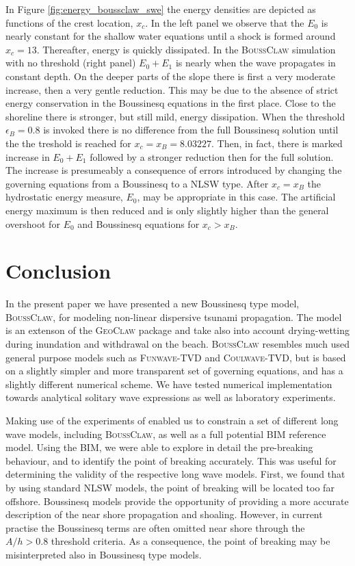 \documentclass[review]{elsarticle}
\newcommand{\BoussClaw}{\textsc{BoussClaw} }
\newcommand{\BoussClawt}{\textsc{BoussClaw}}
\begin{document}
In Figure \ref{fig:energy_boussclaw_swe} the energy densities are depicted as 
functions of the crest location, $x_c$. 
In the left panel 
we observe that the $E_0$ is nearly constant 
for the shallow water equations until a shock is formed around $x_c=13$.
Thereafter, energy is quickly dissipated. 
In  the \BoussClaw simulation with no threshold (right panel) 
$E_0+E_1$ is nearly when the wave propagates in constant depth. 
On the deeper parts of the slope there is first a very moderate increase, then a
very gentle reduction. This may be due to the absence of strict energy  conservation in the Boussinesq equations in the first place. 
Close to the shoreline there is stronger, but still mild, energy dissipation.
When the threshold $\epsilon_B=0.8$ is invoked there is no difference from the full Boussinesq solution until the the treshold is reached for 
 $x_c=x_B=8.03227$. Then, in fact, there is marked increase in $E_0+E_1$ followed by a stronger  reduction then for the full solution.
The increase is presumeably a consequence of errors introduced by changing the 
governing equations from a Boussinesq to a NLSW type. 
After  $x_c=x_B$  
the hydrostatic energy measure, $E_0$, may be appropriate in this case.
The artificial energy maximum  is then reduced and is only slightly higher than
the general overshoot for $E_0$ and Boussinesq equations for $x_c>x_B$.  

\section{Conclusion}
\label{sec:conclusion}

In the present paper we have presented a new  
Boussinesq type model, \BoussClawt,
for modeling non-linear dispersive tsunami propagation. The model is an extenson of the \textsc{GeoClaw} package and  take also into account drying-wetting during inundation and withdrawal on the beach.
\BoussClaw resembles much used general purpose models such as \textsc{Funwave-TVD} and
\textsc{Coulwave-TVD}, but is based on a slightly simpler and more transparent set of governing equations,
and has a slightly different numerical scheme. We have tested numerical implementation towards
analytical solitary wave expressions as well as laboratory experiments.

Making use of the experiments of \citet{synolakis1987runup} 
enabled us to
constrain a set of different long wave models, including \BoussClawt, as well as a full potential
BIM reference model. Using the BIM, we were able to explore in detail the pre-breaking behaviour,
and to identify the point of breaking accurately. This was useful for determining the 
validity of the respective long wave models. First, we found that by using standard NLSW models,
the point of breaking will be located too far offshore. Boussinesq models
provide the opportunity of providing a more accurate description of the near shore propagation and shoaling. 
However, in current practise the Boussinesq terms are often omitted near shore through the $A/h>0.8$ threshold criteria.
As a consequence, the point of breaking may be misinterpreted also in Boussinesq type models.
\end{document}
